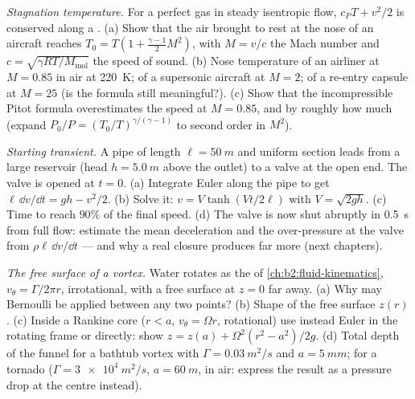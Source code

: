 \begin{exercise}[$\star\star\star$]\label{exo:b2:euler-bernoulli:10}
\emph{Stagnation temperature.} For a perfect gas in steady isentropic
flow, $c_PT + v^2/2$ is conserved along a . (a) Show that the
air brought to rest at the nose of an aircraft reaches $T_0 = T(1 +
\tfrac{\gamma - 1}{2}M^2)$, with $M = v/c$ the Mach number and $c =
\sqrt{\gamma RT/M_{\text{mol}}}$ the speed of sound. (b) Nose temperature
of an airliner at $M = 0.85$ in air at \qty{220}{K}; of a supersonic
aircraft at $M = 2$; of a re-entry capsule at $M = 25$ (is the formula
still meaningful?). (c) Show that the incompressible Pitot formula
overestimates the speed at $M = 0.85$, and by roughly how much (expand
$P_0/P = (T_0/T)^{\gamma/(\gamma - 1)}$ to second order in $M^2$).
\end{exercise}

\begin{exercise}[$\star\star\star$]\label{exo:b2:euler-bernoulli:11}
\emph{Starting transient.} A pipe of length $\ell = \qty{50}{m}$ and uniform
section leads from a large reservoir (head $h = \qty{5.0}{m}$ above the
outlet) to a valve at the open end. The valve is opened at $t = 0$. (a)
Integrate Euler along the pipe to get $\ell\,\dd v/\dd t = gh - v^2/2$.
(b) Solve it: $v = V\tanh(Vt/2\ell)$ with $V = \sqrt{2gh}$. (c) Time to
reach $90\%$ of the final speed. (d) The valve is now shut abruptly in
\qty{0.5}{s} from full flow: estimate the mean deceleration and the
over-pressure at the valve from $\rho\ell\,\dd v/\dd t$ --- and why a real
closure produces far more (next chapters).
\end{exercise}

\begin{exercise}[$\star\star\star$]\label{exo:b2:euler-bernoulli:12}
\emph{The free surface of a vortex.} Water rotates as the 
of \cref{ch:b2:fluid-kinematics}, $v_\theta = \Gamma/2\pi r$, irrotational,
with a free surface at $z = 0$ far away. (a) Why may Bernoulli be applied
between any two points? (b) Shape of the free surface $z(r)$. (c)
Inside a Rankine core ($r < a$, $v_\theta = \Omega r$, rotational) use
instead Euler in the rotating frame or directly: show $z = z(a) +
\Omega^2(r^2 - a^2)/2g$. (d) Total depth of the funnel for a bathtub
vortex with $\Gamma = \qty{0.03}{m^2/s}$ and $a = \qty{5}{mm}$; for a tornado
($\Gamma = \qty{3e4}{m^2/s}$, $a = \qty{60}{m}$, in air: express the
result as a pressure drop at the centre instead).
\end{exercise}

